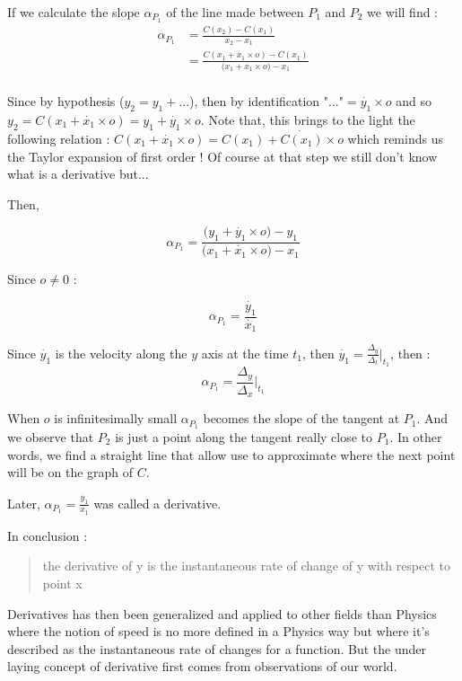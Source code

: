 \documentclass[12pt]{article}
\begin{document}
If we calculate the slope $\alpha_{P_1}$ of the line made between $P_1$ and $P_2$ we will find :
\begin{equation*}
    \begin{split}
        \alpha_{P_1} &= \frac{C(x_2)-C(x_1)}{x_2-x_1} \\
                    &= \frac{ C(x_1 + \dot{x_1} \times o) -C(x_1)}{\big( x_1 + \dot{x_1} \times o \big) -x_1} \\
    \end{split}
\end{equation*}

Since by hypothesis ($y_2 = y_1 + ...$), then by identification $\text{"..."} = \dot{y_1} \times o$ and so $y_2=C(x_1 + \dot{x_1} \times o)=y_1 + \dot{y_1} \times o$. Note that, this brings to the light the following relation : $C(x_1 + \dot{x_1} \times o) = C(x_1) + \dot{C(x_1)} \times o$ which reminds us the Taylor expansion \cite{wiki_taylor_series} of first order ! Of course at that step we still don't know what is a derivative but...

Then, 

\begin{equation*}
\alpha_{P_1} = \frac{ \big( y_1 + \dot{y_1} \times o \big) - y_1}{\big( x_1 + \dot{x_1} \times o \big) -x_1}
\end{equation*}

Since $o \neq 0$ : 

$$
\alpha_{P_1} = \frac{\dot{y_1}}{\dot{x_1}}
$$

Since $\dot{y_1}$ is the velocity along the $y$ axis at the time $t_1$, then $\dot{y_1} = \frac{\Delta_y}{\Delta_t}|_{t_1}$, then :
$$
\alpha_{P_1} = \frac{\Delta_y}{\Delta_x} \big|_{t_1}
$$

When $o$ is infinitesimally small $\alpha_{P_1}$ becomes the slope of the tangent at $P_1$. And we observe that $P_2$ is just a point along the tangent really close to $P_1$. In other words, we find a straight line that allow use to approximate where the next point will be on the graph of $C$.

Later, $\alpha_{P_1} = \frac{\dot{y_1}}{\dot{x_1}}$ was called a derivative.

\bigskip

In conclusion :
\begin{quote}
the derivative of y is the instantaneous rate of change of y with respect to point x
\end{quote}

Derivatives has then been generalized and applied to other fields than Physics where the notion of speed is no more defined in a Physics way but where it's described as the instantaneous rate of changes for a function. But the under laying concept of derivative first comes from observations of our world.
\end{document}
